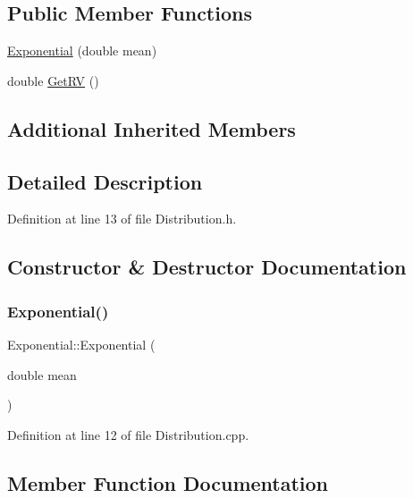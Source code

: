 \subsection*{Public Member Functions}
\begin{DoxyCompactItemize}
\item 
\hyperlink{class_exponential_aa135f2007ad33e977c019e9598f1d208}{Exponential} (double mean)
\item 
double \hyperlink{class_exponential_a2a45aeaf0a3725174d86712761a8dd82}{Get\+RV} ()
\end{DoxyCompactItemize}
\subsection*{Additional Inherited Members}


\subsection{Detailed Description}


Definition at line 13 of file Distribution.\+h.



\subsection{Constructor \& Destructor Documentation}
\mbox{\label{class_exponential_aa135f2007ad33e977c019e9598f1d208}} 
\subsubsection{\texorpdfstring{Exponential()}{Exponential()}}
{\footnotesize\ttfamily Exponential\+::\+Exponential (\begin{DoxyParamCaption}\item[{double}]{mean }\end{DoxyParamCaption})}



Definition at line 12 of file Distribution.\+cpp.



\subsection{Member Function Documentation}
\mbox{\label{class_exponential_a2a45aeaf0a3725174d86712761a8dd82}} 
